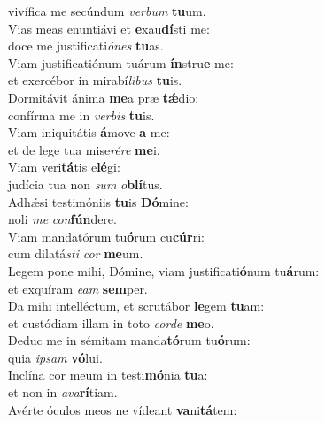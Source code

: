 \oddverse vivífica me secúndum \textit{ver}\textit{bum} \textbf{tu}um.\\
\evenverse Vias meas enuntiávi et \textbf{e}xau\textbf{dí}sti me:~\*\\
\evenverse doce me justificati\textit{ó}\textit{nes} \textbf{tu}as.\\
\oddverse Viam justificatiónum tuárum \textbf{ín}stru\textbf{e} me:~\*\\
\oddverse et exercébor in mirabí\textit{li}\textit{bus} \textbf{tu}is.\\
\evenverse Dormitávit ánima \textbf{me}a præ \textbf{tǽ}dio:~\*\\
\evenverse confírma me in \textit{ver}\textit{bis} \textbf{tu}is.\\
\oddverse Viam iniquitátis \textbf{á}move \textbf{a} me:~\*\\
\oddverse et de lege tua mise\textit{ré}\textit{re} \textbf{me}i.\\
\evenverse Viam veri\textbf{tá}tis e\textbf{lé}gi:~\*\\
\evenverse judícia tua non \textit{sum} \textit{o}\textbf{blí}tus.\\
\oddverse Adhǽsi testimóniis \textbf{tu}is \textbf{Dó}mine:~\*\\
\oddverse noli \textit{me} \textit{con}\textbf{fún}dere.\\
\evenverse Viam mandatórum tu\textbf{ó}rum cu\textbf{cúr}ri:~\*\\
\evenverse cum dilatá\textit{sti} \textit{cor} \textbf{me}um.\\
\oddverse Legem pone mihi, Dómine, viam justificati\textbf{ó}num tu\textbf{á}rum:~\*\\
\oddverse et exquíram \textit{e}\textit{am} \textbf{sem}per.\\
\evenverse Da mihi intelléctum, et scrutábor \textbf{le}gem \textbf{tu}am:~\*\\
\evenverse et custódiam illam in toto \textit{cor}\textit{de} \textbf{me}o.\\
\oddverse Deduc me in sémitam manda\textbf{tó}rum tu\textbf{ó}rum:~\*\\
\oddverse quia \textit{i}\textit{psam} \textbf{vó}lui.\\
\evenverse Inclína cor meum in testi\textbf{mó}nia \textbf{tu}a:~\*\\
\evenverse et non in \textit{a}\textit{va}\textbf{rí}tiam.\\
\oddverse Avérte óculos meos ne vídeant \textbf{va}ni\textbf{tá}tem:~\*\\
